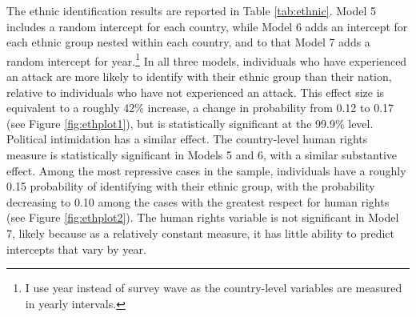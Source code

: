 \documentclass[12pt,]{book}
\let\rmarkdownfootnote\footnote%
\def\footnote{\protect\rmarkdownfootnote}
\theoremstyle{definition}
\theoremstyle{definition}
\theoremstyle{definition}
\theoremstyle{remark}
\begin{document}
The ethnic identification results are reported in Table
\ref{tab:ethnic}. Model 5 includes a random intercept for each country,
while Model 6 adds an intercept for each ethnic group nested within each
country, and to that Model 7 adds a random intercept for year.\footnote{I
  use year instead of survey wave as the country-level variables are
  measured in yearly intervals.} In all three models, individuals who
have experienced an attack are more likely to identify with their ethnic
group than their nation, relative to individuals who have not
experienced an attack. This effect size is equivalent to a roughly 42\%
increase, a change in probability from 0.12 to 0.17 (see Figure
\ref{fig:ethplot1}), but is statistically significant at the 99.9\%
level. Political intimidation has a similar effect. The country-level
human rights measure is statistically significant in Models 5 and 6,
with a similar substantive effect. Among the most repressive cases in
the sample, individuals have a roughly 0.15 probability of identifying
with their ethnic group, with the probability decreasing to 0.10 among
the cases with the greatest respect for human rights (see Figure
\ref{fig:ethplot2}). The human rights variable is not significant in
Model 7, likely because as a relatively constant measure, it has little
ability to predict intercepts that vary by year.
\end{document}
